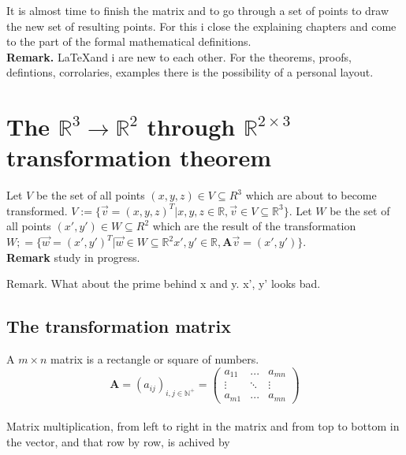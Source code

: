 \documentclass[a4paper]{article}
\begin{document}
It is almost time to finish the matrix and to go through a set of points to draw the new set of resulting points.
For this i close the explaining chapters and come to the part of the formal mathematical definitions.\\


\textbf{Remark.} \LaTeX and i are new to each other. For the theorems, proofs, defintions, corrolaries, examples there is the possibility of a personal layout.\\

\section{The $\mathbb{R}^{3} \rightarrow \mathbb{R}^{2}$ through $\mathbb{R}^{2\times{3}}$ transformation theorem}


Let $V$ be the set of all points $(x,y,z) \in V \subseteq R^3$ which are about to become transformed. $V := \{ \vec{v}=(x,y,z)^T | x,y,z \in \mathbb{R}, \vec{v} \in V \subseteq \mathbb{R}^{3} \}$.
Let $W$ be the set of all points $(x',y') \in W \subseteq R^2$ which are the result of the transformation $W ;= \{ \vec{w}=(x',y')^T | \vec{w} \in W \subseteq \mathbb{R}^{2} x',y' \in \mathbb{R}, \boldsymbol{A}\vec{v}=(x',y')\}$.\\

\textbf{Remark} study in progress.

Remark. What about the prime behind x and y. x', y' looks bad.

\subsection{The transformation matrix}

A $m\times n$ matrix is a rectangle or square of numbers.\\
\begin{displaymath}
    \boldsymbol{A} = (a_{ij})_{i,j \in \mathbb{N}^{+}} = \begin{pmatrix}a_{11} & ... & a_{mn}\\\vdots&\ddots&\vdots\\a_{m1} & ... & a_{mn}\end{pmatrix}
\end{displaymath}\\

Matrix multiplication, from left to right in the matrix and from top to bottom in the vector, and that row by row, is achived by \\
\end{document}

